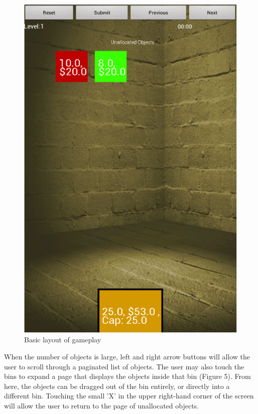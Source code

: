 \documentclass[11pt]{article}
\begin{document}
\begin{figure}[h]
\centering
\includegraphics[scale=0.65]{gameplay.png}
\caption{Basic layout of gameplay}
\end{figure}

When the number of objects is large, left and right arrow buttons will allow the
user to scroll through a paginated list of objects.  The user may also touch the
bins to expand a page that displays the objects inside that bin (Figure 5).
From here, the objects can be dragged out of the bin entirely, or directly into
a different bin.  Touching the small 'X' in the upper right-hand corner of the
screen will allow the user to return to the page of unallocated objects.
\end{document}
